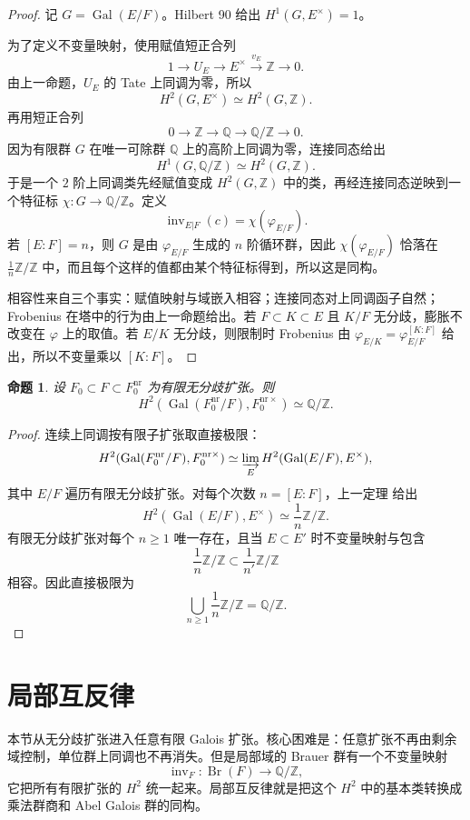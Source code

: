 \documentclass[11pt,a4paper,openany]{ctexbook}
\numberwithin{equation}{chapter}
\newcommand{\Q}{\mathbb{Q}}
\newcommand{\Z}{\mathbb{Z}}
\newcommand{\Gal}{\operatorname{Gal}}
\newcommand{\Br}{\operatorname{Br}}
\theoremstyle{plain}
\newtheorem{proposition}[theorem]{命题}
\theoremstyle{definition}
\theoremstyle{remark}
\begin{document}
\begin{proof}
记 $G=\Gal(E/F)$。Hilbert 90 给出 $H^1(G,E^\times)=1$。

为了定义不变量映射，使用赋值短正合列
\[
1\longrightarrow U_E\longrightarrow E^\times\stackrel{v_E}{\longrightarrow}\Z\longrightarrow0.
\]
由上一命题，$U_E$ 的 Tate 上同调为零，所以
\[
H^2(G,E^\times)\simeq H^2(G,\Z).
\]
再用短正合列
\[
0\longrightarrow \Z\longrightarrow\Q\longrightarrow\Q/\Z\longrightarrow0.
\]
因为有限群 $G$ 在唯一可除群 $\Q$ 上的高阶上同调为零，连接同态给出
\[
H^1(G,\Q/\Z)\simeq H^2(G,\Z).
\]
于是一个 $2$ 阶上同调类先经赋值变成 $H^2(G,\Z)$ 中的类，再经连接同态逆映到一个特征标 $\chi:G\to\Q/\Z$。定义
\[
\operatorname{inv}_{E|F}(c)=\chi(\varphi_{E/F}).
\]
若 $[E:F]=n$，则 $G$ 是由 $\varphi_{E/F}$ 生成的 $n$ 阶循环群，因此 $\chi(\varphi_{E/F})$ 恰落在 $\frac1n\Z/\Z$ 中，而且每个这样的值都由某个特征标得到，所以这是同构。

相容性来自三个事实：赋值映射与域嵌入相容；连接同态对上同调函子自然；Frobenius 在塔中的行为由上一命题给出。若 $F\subset K\subset E$ 且 $K/F$ 无分歧，膨胀不改变在 $\varphi$ 上的取值。若 $E/K$ 无分歧，则限制时 Frobenius 由 $\varphi_{E/K}=\varphi_{E/F}^{[K:F]}$ 给出，所以不变量乘以 $[K:F]$。
\end{proof}

\begin{proposition}
设 $F_0\subset F\subset F_0^{\mathrm{nr}}$ 为有限无分歧扩张。则
\[
H^2(\Gal(F_0^{\mathrm{nr}}/F),F_0^{\mathrm{nr}\times})\simeq \Q/\Z.
\]
\end{proposition}

\begin{proof}
连续上同调按有限子扩张取直接极限：
\[
H^2(\Gal(F_0^{\mathrm{nr}}/F),F_0^{\mathrm{nr}\times})
\simeq \varinjlim_E H^2(\Gal(E/F),E^\times),
\]
其中 $E/F$ 遍历有限无分歧扩张。对每个次数 $n=[E:F]$，上一定理 给出
\[
H^2(\Gal(E/F),E^\times)\simeq \frac1n\Z/\Z.
\]
有限无分歧扩张对每个 $n\ge1$ 唯一存在，且当 $E\subset E'$ 时不变量映射与包含
\[
\frac1n\Z/\Z\subset \frac1{n'}\Z/\Z
\]
相容。因此直接极限为
\[
\bigcup_{n\ge1}\frac1n\Z/\Z=\Q/\Z.
\]
\end{proof}

\section{局部互反律}

本节从无分歧扩张进入任意有限 Galois 扩张。核心困难是：任意扩张不再由剩余域控制，单位群上同调也不再消失。但是局部域的 Brauer 群有一个不变量映射
\[
\operatorname{inv}_F:\Br(F)\longrightarrow \Q/\Z,
\]
它把所有有限扩张的 $H^2$ 统一起来。局部互反律就是把这个 $H^2$ 中的基本类转换成乘法群商和 Abel Galois 群的同构。
\end{document}
